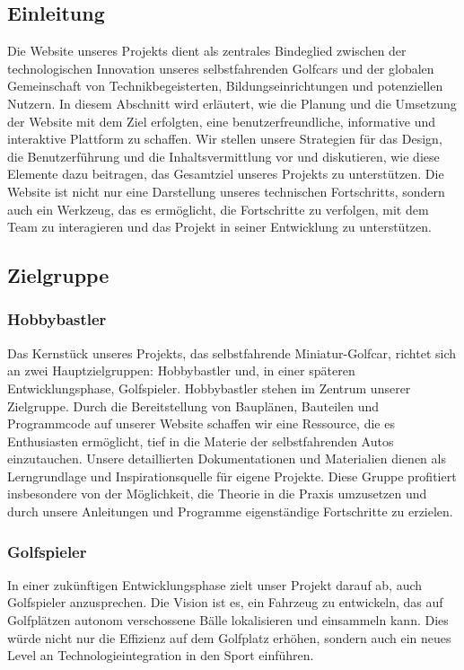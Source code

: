 \subsection{Einleitung}
Die Website unseres Projekts dient als zentrales Bindeglied zwischen der technologischen Innovation unseres selbstfahrenden Golfcars und der globalen Gemeinschaft von Technikbegeisterten, Bildungseinrichtungen und potenziellen Nutzern. In diesem Abschnitt wird erläutert, wie die Planung und die Umsetzung der Website mit dem Ziel erfolgten, eine benutzerfreundliche, informative und interaktive Plattform zu schaffen. Wir stellen unsere Strategien für das Design, die Benutzerführung und die Inhaltsvermittlung vor und diskutieren, wie diese Elemente dazu beitragen, das Gesamtziel unseres Projekts zu unterstützen. Die Website ist nicht nur eine Darstellung unseres technischen Fortschritts, sondern auch ein Werkzeug, das es ermöglicht, die Fortschritte zu verfolgen, mit dem Team zu interagieren und das Projekt in seiner Entwicklung zu unterstützen.

\subsection{Zielgruppe}
\subsubsection{Hobbybastler}
Das Kernstück unseres Projekts, das selbstfahrende Miniatur-Golfcar, richtet sich an zwei Hauptzielgruppen: Hobbybastler und, in einer späteren Entwicklungsphase, Golfspieler. Hobbybastler stehen im Zentrum unserer Zielgruppe. Durch die Bereitstellung von Bauplänen, Bauteilen und Programmcode auf unserer Website schaffen wir eine Ressource, die es Enthusiasten ermöglicht, tief in die Materie der selbstfahrenden Autos einzutauchen. Unsere detaillierten Dokumentationen und Materialien dienen als Lerngrundlage und Inspirationsquelle für eigene Projekte. Diese Gruppe profitiert insbesondere von der Möglichkeit, die Theorie in die Praxis umzusetzen und durch unsere Anleitungen und Programme eigenständige Fortschritte zu erzielen.

\subsubsection{Golfspieler}
In einer zukünftigen Entwicklungsphase zielt unser Projekt darauf ab, auch Golfspieler anzusprechen. Die Vision ist es, ein Fahrzeug zu entwickeln, das auf Golfplätzen autonom verschossene Bälle lokalisieren und einsammeln kann. Dies würde nicht nur die Effizienz auf dem Golfplatz erhöhen, sondern auch ein neues Level an Technologieintegration in den Sport einführen. 

